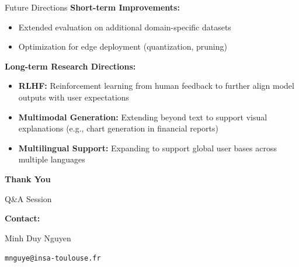 \documentclass[11pt, aspectratio=169, xcolor=table]{beamer}
\begin{document}
\begin{frame}{Future Directions}
    \textbf{\color{MainNavy}Short-term Improvements:}
    \begin{itemize}
        \item Extended evaluation on additional domain-specific datasets
        \item Optimization for edge deployment (quantization, pruning)
    \end{itemize}
    
    \vspace{0.3cm}
    \textbf{\color{MainNavy}Long-term Research Directions:}
    \begin{itemize}
        \item \textbf{RLHF:} Reinforcement learning from human feedback to further align model outputs with user expectations
        \item \textbf{Multimodal Generation:} Extending beyond text to support visual explanations (e.g., chart generation in financial reports)
        \item \textbf{Multilingual Support:} Expanding to support global user bases across multiple languages
    \end{itemize}

\end{frame}

\begin{frame}[plain]
    \begin{center}
        \vfill
        {\Huge\color{MainNavy}\textbf{Thank You}}
        \vspace{0.5cm}
        
        {\Large Q\&A Session}
        \vspace{1cm}
        
        \textbf{Contact:}
        
        Minh Duy Nguyen
        
        \texttt{mnguye@insa-toulouse.fr}
        \vfill
    \end{center}
\end{frame}
\end{document}

